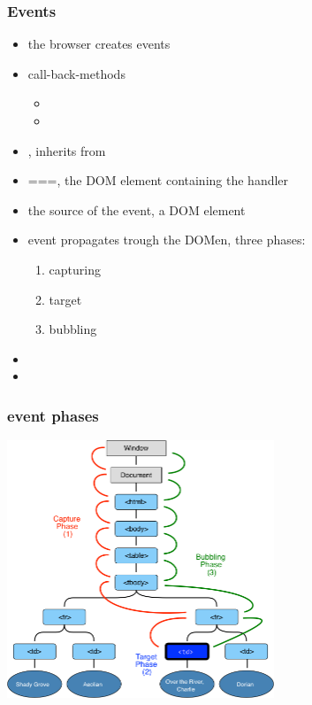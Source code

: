 \begin{frame}[fragile]
\frametitle{Events}
\color{structure}

\begin{itemize}\color{structure}
\item the browser creates events 
\item call-back-methods
\begin{itemize}
  \item {}
  \item {}
\end{itemize}
\item {},  inherits from 
\item {}===, the DOM element containing the handler
\item {} the source of the event, a DOM element
\item event propagates trough the DOMen, three phases:
  \begin{enumerate}
    \item capturing
    \item target
    \item bubbling
  \end{enumerate}
\item {}
\item {}
\end{itemize}

\end{frame}

\begin{frame}[fragile]
\frametitle{event phases}
\color{structure}
  \centering
  \includegraphics[width=8cm]{img/eventflow}

\end{frame}


